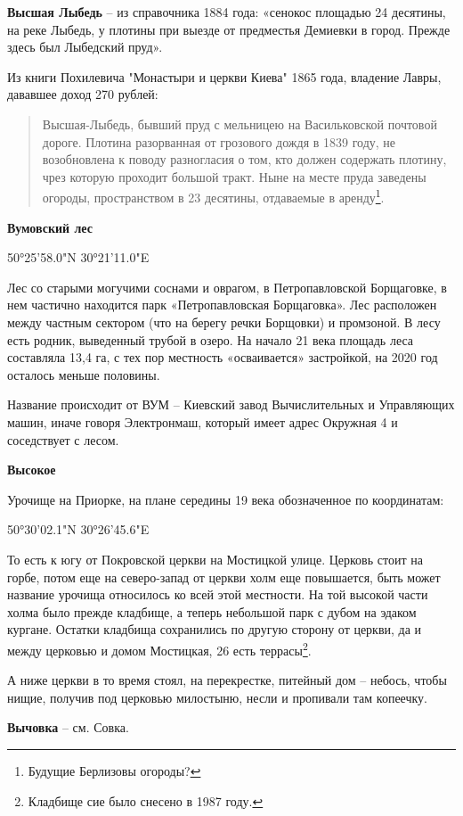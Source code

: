 \medskip

\textbf{Высшая Лыбедь} – из справочника 1884 года: «сенокос площадью 24 десятины, на реке Лыбедь, у плотины при выезде от предместья Демиевки в город. Прежде здесь был Лыбедский пруд».

Из книги Похилевича "Монастыри и церкви Киева" 1865 года, владение Лавры, дававшее доход 270 рублей:

\begin{quotation}
Высшая-Лыбедь, бывший пруд с мельницею на Васильковской почтовой дороге. Плотина разорванная от грозового дождя в 1839 году, не возобновлена к поводу разногласия о том, кто должен содержать плотину, чрез которую проходит большой тракт. Ныне на месте пруда заведены огороды, пространством в 23 десятины, отдаваемые в аренду\footnote{Будущие Берлизовы огороды?}. 
\end{quotation}

\medskip

\textbf{Вумовский лес}

50°25'58.0"N 30°21'11.0"E

Лес со старыми могучими соснами и оврагом, в Петропавловской Борщаговке, в нем частично находится парк «Петропавловская Борщаговка». Лес расположен между частным сектором (что на берегу речки Борщовки) и промзоной. В лесу есть родник, выведенный трубой в озеро. На начало 21 века площадь леса составляла 13,4 га, с тех пор местность «осваивается» застройкой, на 2020 год осталось меньше половины.

Название происходит от ВУМ – Киевский завод Вычислительных и Управляющих машин, иначе говоря Электронмаш, который имеет адрес Окружная 4 и соседствует с лесом.\\

\medskip

\textbf{Высокое}

Урочище на Приорке, на плане середины 19 века обозначенное по координатам:

50°30'02.1"N 30°26'45.6"E

То есть к югу от Покровской церкви на Мостицкой улице. Церковь стоит на горбе, потом еще на северо-запад от церкви холм еще повышается, быть может название урочища относилось ко всей этой местности.  На той высокой части холма было прежде кладбище, а теперь небольшой парк с дубом на эдаком кургане. Остатки кладбища сохранились по другую сторону от церкви, да и между церковью и домом Мостицкая, 26 есть террасы\footnote{Кладбище сие было снесено в 1987 году.}.

А ниже церкви в то время стоял, на перекрестке, питейный дом – небось, чтобы нищие, получив под церковью милостыню, несли и пропивали там копеечку.\\

\medskip

\textbf{Вычовка} – см. Совка.\\